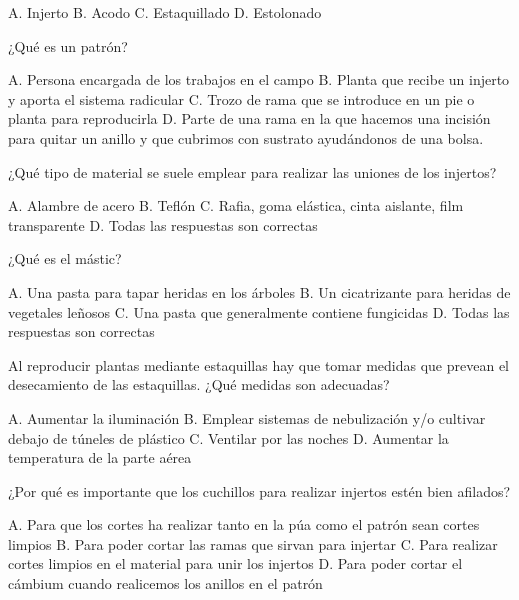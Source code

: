 \documentclass[11pt]{exam}
\begin{document}
{\begin{questions}
\begin{checkboxes}
    \choice A. Injerto
    \CorrectChoice B. Acodo
    \choice C. Estaquillado
    \choice D. Estolonado
  \end{checkboxes}
\question ¿Qué es un patrón?
  \begin{checkboxes}
  \choice A. Persona encargada de los trabajos en el campo
  \CorrectChoice  B. Planta que recibe un injerto y aporta el sistema radicular
  \choice C. Trozo de rama que se introduce en un pie o planta para reproducirla
  \choice D. Parte de una rama en la que hacemos una incisión para quitar un
  anillo y que cubrimos con sustrato ayudándonos de una bolsa.
  \end{checkboxes}
\question ¿Qué tipo de material se suele emplear para realizar las uniones de los
  injertos?
  \begin{checkboxes}
    \choice A. Alambre de acero
    \choice B. Teflón
    \CorrectChoice C. Rafia, goma elástica, cinta aislante, film transparente
    \choice D. Todas las respuestas son correctas 
  \end{checkboxes}
\question ¿Qué es el mástic?
  \begin{checkboxes}
    \choice A. Una pasta para tapar heridas en los árboles
    \choice B. Un cicatrizante para heridas de vegetales leñosos
    \choice C. Una pasta que generalmente contiene fungicidas
    \CorrectChoice D. Todas las respuestas son correctas 
  \end{checkboxes}
  \newpage
\question Al reproducir plantas mediante estaquillas hay que tomar medidas que prevean el
  desecamiento de las estaquillas. ¿Qué medidas son adecuadas?
  \begin{checkboxes}
    \choice A. Aumentar la iluminación
    \CorrectChoice B. Emplear sistemas de nebulización y/o cultivar debajo de túneles de
    plástico
    \choice C. Ventilar por las noches
    \choice D. Aumentar la  temperatura de la parte aérea
  \end{checkboxes}
\question ¿Por qué es importante que los cuchillos para realizar injertos estén bien
  afilados?
  \begin{checkboxes}
    \CorrectChoice A. Para que los cortes ha realizar tanto en la púa como el patrón sean
    cortes limpios
    \choice B. Para poder cortar las ramas que sirvan para injertar
    \choice C. Para realizar cortes limpios en el material para unir los injertos
    \choice D. Para poder cortar el cámbium  cuando realicemos los anillos en el patrón
  \end{checkboxes}
\end{questions}
}
\end{document}
